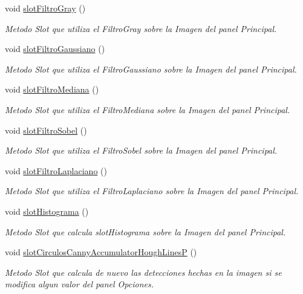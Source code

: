 \begin{DoxyCompactItemize}
void \hyperlink{classCAplicacion_a23aca6a757d7a6ce849ad52719c361f8}{slot\+Filtro\+Gray} ()
\begin{DoxyCompactList}\small\item\em Metodo Slot que utiliza el Filtro\+Gray sobre la Imagen del panel Principal. \end{DoxyCompactList}\item 
void \hyperlink{classCAplicacion_a7f09b7c407550f26bf9cf9300bfe6697}{slot\+Filtro\+Gaussiano} ()
\begin{DoxyCompactList}\small\item\em Metodo Slot que utiliza el Filtro\+Gaussiano sobre la Imagen del panel Principal. \end{DoxyCompactList}\item 
void \hyperlink{classCAplicacion_a767c2c2349db3fda16be49d16ed75e78}{slot\+Filtro\+Mediana} ()
\begin{DoxyCompactList}\small\item\em Metodo Slot que utiliza el Filtro\+Mediana sobre la Imagen del panel Principal. \end{DoxyCompactList}\item 
void \hyperlink{classCAplicacion_ac3f97714202113dc2dad77c0cea45618}{slot\+Filtro\+Sobel} ()
\begin{DoxyCompactList}\small\item\em Metodo Slot que utiliza el Filtro\+Sobel sobre la Imagen del panel Principal. \end{DoxyCompactList}\item 
void \hyperlink{classCAplicacion_ac0602f9cf86587560767791eed28585b}{slot\+Filtro\+Laplaciano} ()
\begin{DoxyCompactList}\small\item\em Metodo Slot que utiliza el Filtro\+Laplaciano sobre la Imagen del panel Principal. \end{DoxyCompactList}\item 
void \hyperlink{classCAplicacion_ae2c3ba106bbe32c000f886172c116c7a}{slot\+Histograma} ()
\begin{DoxyCompactList}\small\item\em Metodo Slot que calcula slot\+Histograma sobre la Imagen del panel Principal. \end{DoxyCompactList}\item 
void \hyperlink{classCAplicacion_a96dd498717a483124d4809dcacc7d799}{slot\+Circulos\+Canny\+Accumulator\+Hough\+LinesP} ()
\begin{DoxyCompactList}\small\item\em Metodo Slot que calcula de nuevo las detecciones hechas en la imagen si se modifica algun valor del panel Opciones. \end{DoxyCompactList}\end{DoxyCompactItemize}
